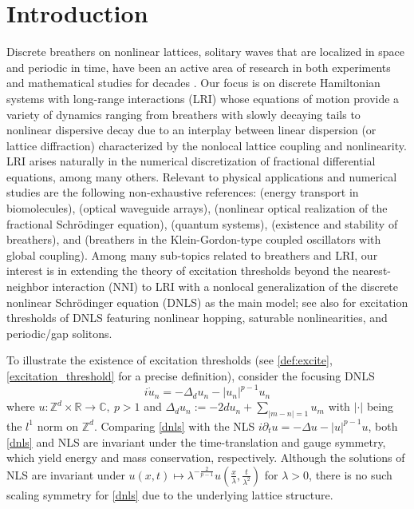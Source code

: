 \documentclass{article}
\numberwithin{equation}{section}
\begin{document}
\section{Introduction}
Discrete breathers on nonlinear lattices, solitary waves that are localized in space and periodic in time, have been an active area of research in both experiments and mathematical studies for decades \cite{kartashov2011solitons,kevrekidis2011non}. Our focus is on discrete Hamiltonian systems with long-range interactions (LRI) whose equations of motion provide a variety of dynamics ranging from breathers with slowly decaying tails to nonlinear dispersive decay due to an interplay between linear dispersion (or lattice diffraction) characterized by the nonlocal lattice coupling and nonlinearity. LRI arises naturally in the numerical discretization of fractional differential equations, among many others. Relevant to physical applications and numerical studies are the following non-exhaustive references: \cite{mingaleev1999models} (energy transport in biomolecules), \cite{efremidis2002discrete,szameit2008long} (optical waveguide arrays), \cite{liu2023experimental} (nonlinear optical realization of the fractional Schr\"odinger equation), \cite{gaididei1997effects,choudhury1996long,korabel2007transition} (quantum systems), \cite{kevrekidis2009non,kevrekidis2013drastic,christiansen1998solitary} (existence and stability of breathers), and \cite{flach1998breathers,moleron2019nonlinear} (breathers in the Klein-Gordon-type coupled oscillators with global coupling). Among many sub-topics related to breathers and LRI, our interest is in extending the theory of excitation thresholds beyond the nearest-neighbor interaction (NNI) \cite{weinstein1999excitation,flach1997energy} to LRI with a nonlocal generalization of the discrete nonlinear Schr\"odinger equation (DNLS) as the main model; see also \cite{kastner2004energy,jcuevas2008thresholds,cuevas2010energy,karachalios2013breathers,cheng2015solitary,cheng2016gap} for excitation thresholds of DNLS featuring nonlinear hopping, saturable nonlinearities, and periodic/gap solitons.

To illustrate the existence of excitation thresholds (see \eqref{def:excite}, \eqref{excitation_threshold} for a precise definition), consider the focusing DNLS
\begin{equation}\label{dnls}
    i \dot{u}_n = -\Delta_d u_n - |u_n|^{p-1} u_n
\end{equation}
where $u:\mathbb{Z}^d \times \mathbb{R} \rightarrow \mathbb{C},\ p > 1$ and $\Delta_{d} u_n := -2d u_n + \sum \limits_{|m-n|=1} u_m$ with $|\cdot|$ being the $l^1$ norm on $\mathbb{Z}^d$. Comparing \eqref{dnls} with the NLS $i \partial_t u = -\Delta u - |u|^{p-1} u$, both \eqref{dnls} and NLS are invariant under the time-translation and gauge symmetry, which yield energy and mass conservation, respectively. Although the solutions of NLS are invariant under $u(x,t) \mapsto \lambda^{-\frac{2}{p-1}} u(\frac{x}{\lambda},\frac{t}{\lambda^2})$ for $\lambda > 0$, there is no such scaling symmetry for \eqref{dnls} due to the underlying lattice structure.
\end{document}
